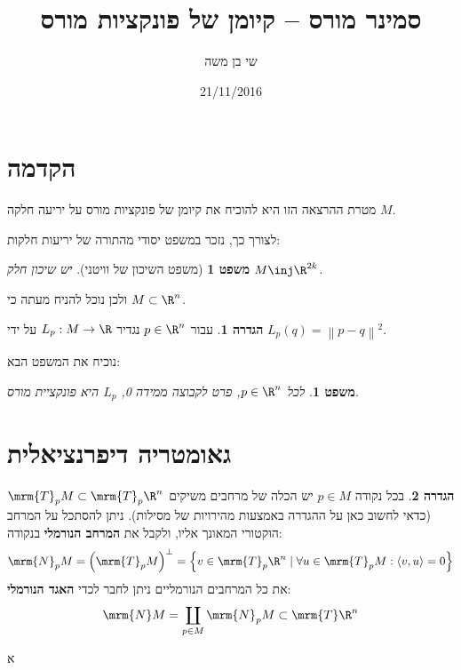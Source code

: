 \documentclass{article}
\title{סמינר מורס – קיומן של פונקציות מורס}
\author{שי בן משה}
\date{21/11/2016}
\newtheorem{theorem}{משפט}
\newtheorem*{theorem*}{משפט}
\theoremstyle{definition}
\newtheorem*{definition*}{הגדרה}
\newcommand{\norm}[1]{\left\lVert#1\right\rVert}
\begin{document}
	\maketitle
	
	
	\section{הקדמה}
	
	מטרת ההרצאה הזו היא להוכיח את קיומן של פונקציות מורס על יריעה חלקה \(M\).
	
	לצורך כך, נזכר במשפט יסודי מהתורה של יריעות חלקות:
	\begin{theorem*}[משפט השיכון של וויטני]
		יש שיכון חלק
		\(M \inj \R^{2k}\).
	\end{theorem*}
	ולכן נוכל להניח מעתה כי
	\(M\subset \R^n\).
	
	\begin{definition*}
		עבור
		\(p\in \R^n\)
		נגדיר
		\(L_p:M\to \R\)
		על ידי
		\(L_p(q)=\norm{p-q}^2\).
	\end{definition*}

	נוכיח את המשפט הבא:
	\begin{theorem}
		לכל
		\(p\in \R^n\),
		פרט לקבוצה ממידה 0, \(L_p\) היא פונקציית מורס.
	\end{theorem}


	\section{גאומטריה דיפרנציאלית}
	
	\begin{definition*}
		בכל נקודה
		$p\in M$
		יש הכלה של מרחבים משיקים
		\(\mrm{T}_p M \subset \mrm{T}_p \R^n\)
		(כדאי לחשוב כאן על ההגדרה באמצעות מהירויות של מסילות).
		ניתן להסתכל על המרחב הוקטורי המאונך אליו, ולקבל את \textbf{המרחב הנורמלי} בנקודה:
		\[
			\mrm{N}_p M
			= \left(\mrm{T}_p M\right)^\bot
			= \left\{
				v \in \mrm{T}_p \R^n
				\mid
				\forall u \in \mrm{T}_p M: \langle v,u \rangle=0
			\right\}
		\]
		את כל המרחבים הנורמליים ניתן לחבר לכדי \textbf{האגד הנורמלי}:
		\[
			\mrm{N} M
			= \coprod_{p \in M} \mrm{N}_p M
			\subset \mrm{T} \R^n
		\]
		
		א
	\end{definition*}
	
	
\end{document}
